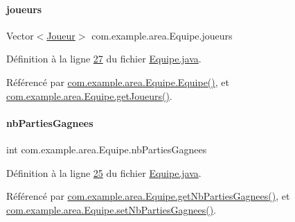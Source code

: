 \paragraph{\texorpdfstring{joueurs}{joueurs}}
{\footnotesize\ttfamily Vector$<$\hyperlink{classcom_1_1example_1_1area_1_1_joueur}{Joueur}$>$ com.\+example.\+area.\+Equipe.\+joueurs\hspace{0.3cm}{\ttfamily [private]}}



Définition à la ligne \hyperlink{_equipe_8java_source_l00027}{27} du fichier \hyperlink{_equipe_8java_source}{Equipe.\+java}.



Référencé par \hyperlink{_equipe_8java_source_l00030}{com.\+example.\+area.\+Equipe.\+Equipe()}, et \hyperlink{_equipe_8java_source_l00053}{com.\+example.\+area.\+Equipe.\+get\+Joueurs()}.

\mbox{\label{classcom_1_1example_1_1area_1_1_equipe_af01e154be3aaa3fbcf909c3a44734b2e}} 
\paragraph{\texorpdfstring{nb\+Parties\+Gagnees}{nbPartiesGagnees}}
{\footnotesize\ttfamily int com.\+example.\+area.\+Equipe.\+nb\+Parties\+Gagnees\hspace{0.3cm}{\ttfamily [private]}}



Définition à la ligne \hyperlink{_equipe_8java_source_l00025}{25} du fichier \hyperlink{_equipe_8java_source}{Equipe.\+java}.



Référencé par \hyperlink{_equipe_8java_source_l00038}{com.\+example.\+area.\+Equipe.\+get\+Nb\+Parties\+Gagnees()}, et \hyperlink{_equipe_8java_source_l00048}{com.\+example.\+area.\+Equipe.\+set\+Nb\+Parties\+Gagnees()}.

\mbox{\label{classcom_1_1example_1_1area_1_1_equipe_ac93205e041df88192dd6b1dfc8488e0a}} 
